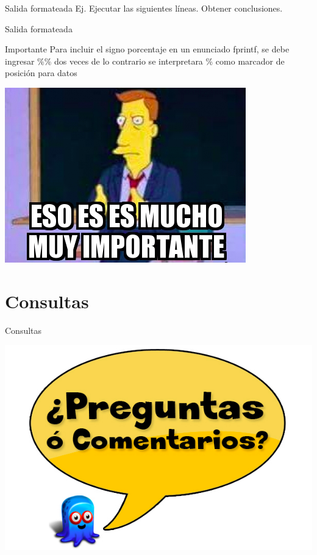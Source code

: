 \documentclass{bredelebeamer}
\begin{document}
\begin{frame}{Salida formateada}
Ej. Ejecutar las siguientes líneas. Obtener conclusiones.
\end{frame}

\begin{frame}{Salida formateada}
\begin{alertblock}{Importante}
Para incluir el signo porcentaje en un enunciado fprintf, se debe ingresar \%\% dos veces de lo contrario se interpretara \% como marcador de posición para datos
\end{alertblock}
\begin{center}
\includegraphics[scale=0.4]{images/img41.png}
\end{center}
\end{frame}




\section{Consultas}
\begin{frame}{Consultas}
\begin{center}
\includegraphics[scale=0.3]{images/consultas.png}
\end{center}
\end{frame}
\end{document}
